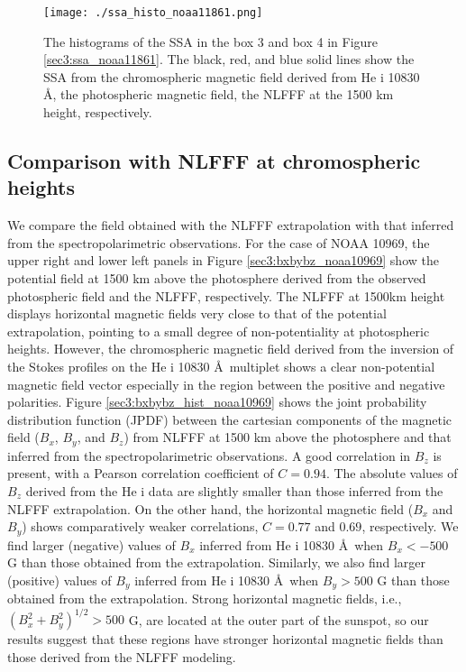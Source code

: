 \documentclass[manuscript]{aastex61}
\begin{document}
\begin{figure}
\texttt{[image: ./ssa\_histo\_noaa11861.png]}
\caption{The histograms of the SSA in the box 3 and box 4 in Figure \ref{sec3:ssa_noaa11861}. The black, red, and blue solid lines show the SSA from the chromospheric magnetic field derived from He {\sc i} 10830 \AA, the photospheric magnetic field, the NLFFF at the 1500 km height, respectively.}
\label{sec3:ssa_histo_noaa11861}
\end{figure}

\subsection{Comparison with NLFFF at chromospheric heights
\label{sec3:chrom_nlfff}}
We compare the field obtained with the NLFFF extrapolation with that
inferred from the spectropolarimetric observations.
For the case of NOAA 10969, the upper right and lower left panels in Figure
\ref{sec3:bxbybz_noaa10969} show the potential field at 1500 km above the
photosphere derived from the observed photospheric field and the NLFFF,
respectively. The NLFFF at 1500km height displays 
horizontal magnetic fields very close to that of the potential extrapolation, pointing
to a small degree of non-potentiality at photospheric heights. 
However, the chromospheric magnetic field derived from the
inversion of the Stokes profiles on the He {\sc i} 10830 \AA\ multiplet 
shows a clear non-potential magnetic field vector
especially in the region between the positive and negative polarities. 
Figure \ref{sec3:bxbybz_hist_noaa10969} shows the joint probability distribution function (JPDF) between the cartesian components of the magnetic field ($B_x$, $B_y$, and $B_z$) from NLFFF at 1500 km above the photosphere and
that inferred from the spectropolarimetric observations. 
A good correlation in $B_z$ is present, with a Pearson correlation coefficient of
$C=0.94$. The absolute values of $B_z$ derived from the He {\sc i} data are
slightly smaller than those inferred from the NLFFF extrapolation. On the other hand, the horizontal
magnetic field ($B_x$ and $B_y$) shows comparatively weaker correlations,
$C=0.77$ and $0.69$, respectively.  We find larger (negative) values of $B_x$ inferred from 
He {\sc i} 10830 \AA \ when $B_x < -500$ G than those obtained from the extrapolation. 
Similarly, we also find larger (positive) values of $B_y$ inferred from 
He {\sc i} 10830 \AA \  when $B_y > 500$ G than those obtained from the extrapolation.
Strong horizontal magnetic fields, i.e., $(B_x^2+B_y^2)^{1/2}>500$ G, are located at the outer
part of the sunspot, so our results suggest that these regions have
stronger horizontal magnetic fields than those derived from the NLFFF
modeling. 
\end{document}
